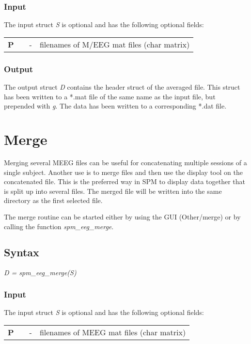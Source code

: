 \subsubsection{Input}
The input struct {\it S} is optional and has the following optional fields:

\begin{tabular}{llcp{9cm}}
{\bf P} & & - & filenames of M/EEG mat files (char matrix)\\
\end{tabular}

\subsubsection{Output}
The output struct {\it D} contains the header struct of the averaged
file. This struct has been written to a *.mat file of the same name as
the input file, but prepended with {\it g}. The data has been
written to a corresponding *.dat file.


\section{Merge}
Merging several MEEG files can be useful for concatenating multiple
sessions of a single subject. Another use is to merge files and then
use the display tool on the concatenated file. This is the preferred
way in SPM to display data together that is split up into several
files. The merged file will be written into the same directory as the
first selected file.

The merge routine can be started either by using the GUI
(Other/merge) or by calling the function
\textit{spm\_eeg\_merge}.

\subsection{Syntax}
\textit{D = spm\_eeg\_merge(S)}
\\

\subsubsection{Input}
The input struct {\it S} is optional and has the following optional fields:

\begin{tabular}{llcp{9cm}}
{\bf P} & & - & filenames of MEEG mat files (char matrix)\\
\end{tabular}

